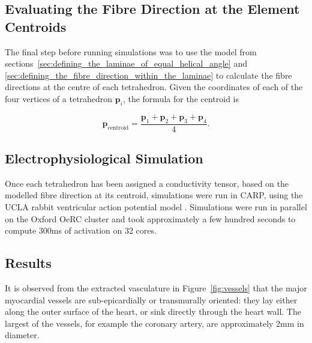 \subsection{Evaluating the Fibre Direction at the Element Centroids} %
\label{sec:evaluating_the_fibre_direction_at_the_element_centroids}
  The final step before running simulations was to use the model from sections~\ref{sec:defining_the_laminae_of_equal_helical_angle} and \ref{sec:defining_the_fibre_direction_within_the_laminae} to calculate the fibre directions at the centre of each tetrahedron. Given the coordinates of each of the four vertices of a tetrahedron $\mathbf{p}_i$, the formula for the centroid is
  
  \begin{equation}
    \mathbf{p}_{\text{centroid}} = \frac{\mathbf{p}_1+\mathbf{p}_2+\mathbf{p}_3+\mathbf{p}_4}{4} .
  \end{equation}
  

\subsection{Electrophysiological Simulation} %
\label{sec:electrophysiological_simulation}  
  Once each tetrahedron has been assigned a conductivity tensor, based on the modelled fibre direction at its centroid, simulations were run in CARP, using the UCLA rabbit ventricular action potential model \cite{Mahajan2008}. Simulations were run in parallel on the Oxford OeRC cluster and took approximately a few hundred seconds to compute 300ms of activation on 32 cores.
  
\subsection{Results} %
\label{sec:results}
  
  It is observed from the extracted vasculature in Figure~\ref{fig:vessels} that the major myocardial vessels are sub-epicardially or transmurally oriented: they lay either along the outer surface of the heart, or sink directly through the heart wall. The largest of the vessels, for example the coronary artery, are approximately 2mm in diameter.
  
